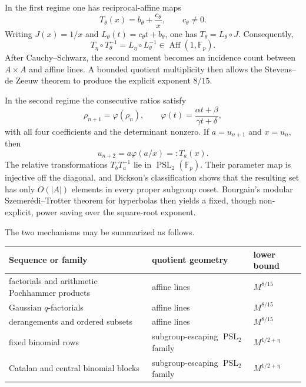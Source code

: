 \documentclass[11pt,reqno]{amsart}
\numberwithin{equation}{section}
\theoremstyle{definition}
\theoremstyle{remark}
\newcommand{\F}{\mathbb F}
\newcommand{\Aff}{\operatorname{Aff}}
\newcommand{\PSL}{\operatorname{PSL}}
\begin{document}
In the first regime one has reciprocal-affine maps
\begin{equation}\label{eq:reciprocal-affine-intro}
  T_\theta(x)=b_\theta+\frac{c_\theta}{x},
  \qquad c_\theta\ne0.
\end{equation}
Writing $J(x)=1/x$ and $L_\theta(t)=c_\theta t+b_\theta$, one has $T_\theta=L_\theta\circ J$.  Consequently,
\[
  T_\eta\circ T_\theta^{-1}=L_\eta\circ L_\theta^{-1}\in\Aff(1,\F_p).
\]
After Cauchy--Schwarz, the second moment becomes an incidence count between $A\times A$ and affine lines.  A bounded quotient multiplicity then allows the Stevens--de Zeeuw theorem to produce the explicit exponent $8/15$.

In the second regime the consecutive ratios satisfy
\begin{equation}\label{eq:mobius-ratio-intro}
  \rho_{n+1}=\varphi(\rho_n),
  \qquad
  \varphi(t)=\frac{\alpha t+\beta}{\gamma t+\delta},
\end{equation}
with all four coefficients and the determinant nonzero.  If $a=u_{n+1}$ and $x=u_n$, then
\[
  u_{n+2}=a\varphi(a/x)=:T_a(x).
\]
The relative transformations $T_bT_a^{-1}$ lie in $\PSL_2(\F_p)$.  Their parameter map is injective off the diagonal, and Dickson's classification shows that the resulting set has only $O(|A|)$ elements in every proper subgroup coset.  Bourgain's modular Szemer\'edi--Trotter theorem for hyperbolas then yields a fixed, though non-explicit, power saving over the square-root exponent.

The two mechanisms may be summarized as follows.

\begin{center}
\small
\begin{tabular}{@{}lll@{}}
\toprule
Sequence or family & quotient geometry & lower bound \\
\midrule
factorials and arithmetic Pochhammer products & affine lines & $M^{8/15}$ \\
Gaussian $q$-factorials & affine lines & $M^{8/15}$ \\
derangements and ordered subsets & affine lines & $M^{8/15}$ \\
fixed binomial rows & subgroup-escaping $\PSL_2$ family & $M^{1/2+\eta}$ \\
Catalan and central binomial blocks & subgroup-escaping $\PSL_2$ family & $M^{1/2+\eta}$ \\
\bottomrule
\end{tabular}
\end{center}
\end{document}
